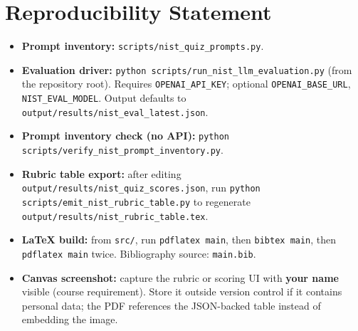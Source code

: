 \section*{Reproducibility Statement}

\begin{itemize}
  \item \textbf{Prompt inventory:} \texttt{scripts/nist\_quiz\_prompts.py}.
  \item \textbf{Evaluation driver:} \texttt{python scripts/run\_nist\_llm\_evaluation.py} (from the repository root). Requires \texttt{OPENAI\_API\_KEY}; optional \texttt{OPENAI\_BASE\_URL}, \texttt{NIST\_EVAL\_MODEL}. Output defaults to \texttt{output/results/nist\_eval\_latest.json}.
  \item \textbf{Prompt inventory check (no API):} \texttt{python scripts/verify\_nist\_prompt\_inventory.py}.
  \item \textbf{Rubric table export:} after editing \texttt{output/results/nist\_quiz\_scores.json}, run \texttt{python scripts/emit\_nist\_rubric\_table.py} to regenerate \texttt{output/results/nist\_rubric\_table.tex}.
  \item \textbf{LaTeX build:} from \texttt{src/}, run \texttt{pdflatex main}, then \texttt{bibtex main}, then \texttt{pdflatex main} twice. Bibliography source: \texttt{main.bib}.
  \item \textbf{Canvas screenshot:} capture the rubric or scoring UI with \textbf{your name} visible (course requirement). Store it outside version control if it contains personal data; the PDF references the JSON-backed table instead of embedding the image.
\end{itemize}
